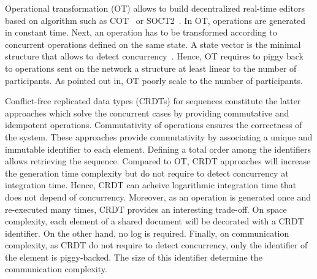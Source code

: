 \begin{asparadesc}

\item [Operational transformation (OT)] allows to build decentralized
  real-time editors based on algorithm such as
  COT~\cite{sun2009contextbased} or SOCT2~\cite{Vidot00}. In OT,
  operations are generated in constant time. Next, an operation has to
  be transformed according to concurrent operations defined on the
  same state. %
  A state vector is the minimal structure that allows to detect
  concurrency~\cite{charronbost1991concerning}. Hence, OT requires to
  piggy back to operations sent on the network a structure at least
  linear to the number of participants.  As pointed out
  in\cite{oster2006data}, OT poorly scale to the number of
  participants.  

\item [Conflict-free replicated data types] (CRDTs) for sequences
  constitute the latter approaches which solve the concurrent cases by
  providing commutative and idempotent operations. Commutativity of
  operations ensures the correctness of the system. These approaches
  provide commutativity by associating a unique and immutable
  identifier to each element. Defining a total order among the
  identifiers allows retrieving the sequence. Compared to OT, CRDT
  approaches will increase the generation time complexity but do not
  require to detect concurrency at integration time. Hence, CRDT can
  acheive logarithmic integration time that does not depend of
  concurrency. Moreover, as an operation is generated once and
  re-executed many times, CRDT provides an interesting trade-off. On
  space complexity, each element of a shared document will be
  decorated with a CRDT identifier. On the other hand, no log is
  required. Finally, on communication complexity, as CRDT do not require to
  detect concurrency, only the identifier of the element is
  piggy-backed. The size of this identifier determine the
  communication complexity.


\end{asparadesc}
